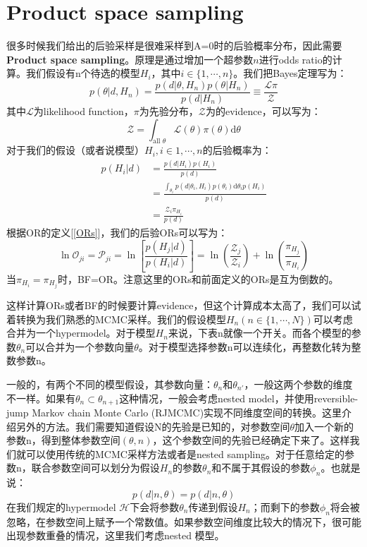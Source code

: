 \section{Product space sampling}
很多时候我们给出的后验采样是很难采样到A=0时的后验概率分布，因此需要\textbf{Product space sampling}。原理是通过增加一个超参数$n$进行odds ratio的计算。我们假设有n个待选的模型$H_i$，其中$i\in \{1,\cdots,n\}$。我们把Bayes定理写为：
\begin{equation}
    p(\theta|d,H_n)=\frac{p(d|\theta,H_n)p(\theta|H_n)}{p(d|H_n)}\equiv \frac{\mathcal{L}\pi}{\mathcal{Z}}
\end{equation}
其中$\mathcal{L}$为likelihood function，$\pi$为先验分布，$\mathcal{Z}$为的evidence，可以写为：
\begin{equation}
    \mathcal{Z}=\int_{\textrm{all }\theta}\mathcal{L}(\theta)\pi(\theta)\textrm{d}\theta
\end{equation}
对于我们的假设（或者说模型）$H_i,i\in{1,\cdots,n}$的后验概率为：
\begin{equation}
    \begin{aligned}
        p(H_i|d)&=\frac{p(d|H_i)p(H_i)}{p(d)}\\
        &=\frac{\int_{\theta_i} p(d|\theta_i,H_i)p(\theta_i)\textrm{d}\theta_i p(H_i)}{p(d)}\\
        &=\frac{\mathcal{Z}_i\pi_{H_i}}{p(d)}
    \end{aligned}
\end{equation}
根据OR的定义[\ref{ORs}]，我们的后验ORs可以写为：
\begin{equation}
    \ln \mathcal{O}_{ji}=\mathcal{P}_{ji}
    =\ln\left[ \frac{p(H_j|d)}{p(H_i|d)} \right]
    =\ln\left(\frac{\mathcal{Z}_j}{\mathcal{Z}_i}\right)+\ln \left(\frac{\pi_{H_j}}{\pi_{H_i}}\right)
\end{equation}
当$\pi_{H_i}=\pi_{H_j}$时，BF=OR。注意这里的ORs和前面定义的ORs是互为倒数的。

这样计算ORs或者BF的时候要计算evidence，但这个计算成本太高了，我们可以试着转换为我们熟悉的MCMC采样。我们的假设模型$H_n(n\in \{1,\cdots,N\})$可以考虑合并为一个hypermodel。对于模型$H_n$来说，下表n就像一个开关。而各个模型的参数$\theta_n$可以合并为一个参数向量$\theta$。对于模型选择参数n可以连续化，再整数化转为整数参数n。

一般的，有两个不同的模型假设，其参数向量：$\theta_n$和$\theta_{n'}$，一般这两个参数的维度不一样。如果有$\theta_n \subset \theta_{n+1}$这种情况，一般会考虑nested model，并使用reversible-jump Markov chain Monte Carlo (RJMCMC)实现不同维度空间的转换。这里介绍另外的方法。我们需要知道假设N的先验是已知的，对参数空间$\theta$加入一个新的参数n，得到整体参数空间$(\theta,n)$，这个参数空间的先验已经确定下来了。这样我们就可以使用传统的MCMC采样方法或者是nested sampling。对于任意给定的参数n，联合参数空间可以划分为假设$H_n$的参数$\theta_n$和不属于其假设的参数$\phi_n$。也就是说：
\begin{equation}
    p(d|n,\theta)=p(d|n,\theta)
\end{equation}
在我们规定的hypermodel $\mathcal{H}$下会将参数$\theta_n$传递到假设$H_n$；而剩下的参数$\phi_n$将会被忽略，在参数空间上赋予一个常数值。如果参数空间维度比较大的情况下，很可能出现参数重叠的情况，这里我们考虑nested 模型。

